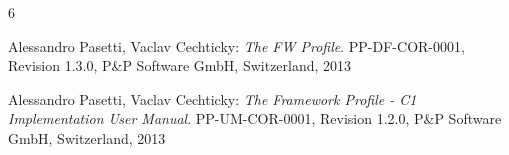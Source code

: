 \documentclass[requirements]{../fwprofile}
\begin{document}
\newpage

\begin{thebibliography}{6}
 
 Alessandro Pasetti, Vaclav Cechticky:
            {\sl The FW Profile}. PP-DF-COR-0001, Revision 1.3.0,
            P\&P Software GmbH, Switzerland, 2013
 
 Alessandro Pasetti, Vaclav Cechticky:
            {\sl The Framework Profile - C1 Implementation User Manual}. PP-UM-COR-0001, 
            Revision 1.2.0,
            P\&P Software GmbH, Switzerland, 2013
 
\end{thebibliography}
\end{document}
